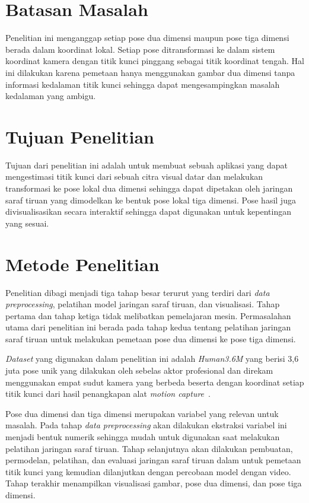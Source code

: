 \section{Batasan Masalah}
\label{sec:1-BatasMasalah}

Penelitian ini menganggap setiap pose dua dimensi maupun pose tiga dimensi berada dalam koordinat
lokal. Setiap pose ditransformasi ke dalam sistem koordinat kamera dengan titik kunci pinggang
sebagai titik koordinat tengah. Hal ini dilakukan karena pemetaan hanya menggunakan gambar dua dimensi
tanpa informasi kedalaman titik kunci sehingga dapat mengesampingkan masalah kedalaman yang ambigu.

\section{Tujuan Penelitian}
\label{sec:1-TujuanPenelitian}

Tujuan dari penelitian ini adalah untuk membuat sebuah aplikasi yang dapat mengestimasi titik kunci dari
sebuah citra visual datar dan melakukan transformasi ke pose lokal dua dimensi sehingga dapat
dipetakan oleh jaringan saraf tiruan yang dimodelkan ke bentuk pose lokal tiga dimensi. Pose hasil
juga divisualisasikan secara interaktif sehingga dapat digunakan untuk kepentingan yang sesuai.

\section{Metode Penelitian}
\label{sec:1-MetodePenelitian}

Penelitian dibagi menjadi tiga tahap besar terurut yang terdiri dari \textit{data preprocessing},
pelatihan model jaringan saraf tiruan, dan visualisasi. Tahap pertama dan tahap ketiga tidak
melibatkan pemelajaran mesin. Permasalahan utama dari penelitian ini berada pada tahap kedua tentang
pelatihan jaringan saraf tiruan untuk melakukan pemetaan pose dua dimensi ke pose tiga dimensi.

\textit{Dataset} yang digunakan dalam penelitian ini adalah \textit{Human3.6M} yang berisi 3,6 juta
pose unik yang dilakukan oleh sebelas aktor profesional dan direkam menggunakan empat sudut kamera
yang berbeda beserta dengan koordinat setiap titik kunci dari hasil penangkapan alat
\textit{motion capture}~\cite{h36m_pami}.

Pose dua dimensi dan tiga dimensi merupakan variabel yang relevan untuk masalah. Pada tahap
\textit{data preprocessing} akan dilakukan ekstraksi variabel ini menjadi bentuk numerik sehingga
mudah untuk digunakan saat melakukan pelatihan jaringan saraf tiruan. Tahap selanjutnya akan
dilakukan pembuatan, permodelan, pelatihan, dan evaluasi jaringan saraf tiruan dalam untuk
pemetaan titik kunci yang kemudian dilanjutkan dengan percobaan model dengan video. Tahap terakhir
menampilkan visualisasi gambar, pose dua dimensi, dan pose tiga dimensi.

